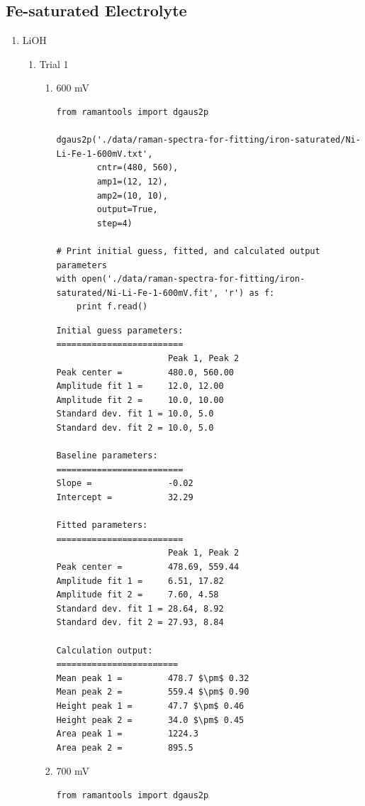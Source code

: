 \documentclass[journal=jpccck,manuscript=suppinfo,email=true]{achemso}
\begin{document}
\subsection{Fe-saturated Electrolyte}
\label{sec-4-2}
\begin{enumerate}
\item LiOH
\label{sec-4-2-0-1}
\begin{enumerate}
\item Trial 1
\label{sec-4-2-0-1-1}
\begin{enumerate}
\item 600 mV
\label{sec-4-2-0-1-1-1}
\begin{verbatim}
from ramantools import dgaus2p

dgaus2p('./data/raman-spectra-for-fitting/iron-saturated/Ni-Li-Fe-1-600mV.txt',
        cntr=(480, 560),
        amp1=(12, 12),
        amp2=(10, 10),
        output=True,
        step=4)

# Print initial guess, fitted, and calculated output parameters
with open('./data/raman-spectra-for-fitting/iron-saturated/Ni-Li-Fe-1-600mV.fit', 'r') as f:
    print f.read()
\end{verbatim}

\begin{verbatim}
Initial guess parameters:
=========================
                      Peak 1, Peak 2
Peak center =         480.0, 560.00
Amplitude fit 1 =     12.0, 12.00
Amplitude fit 2 =     10.0, 10.00
Standard dev. fit 1 = 10.0, 5.0
Standard dev. fit 2 = 10.0, 5.0

Baseline parameters:
=========================
Slope =               -0.02
Intercept =           32.29

Fitted parameters:
=========================
                      Peak 1, Peak 2
Peak center =         478.69, 559.44
Amplitude fit 1 =     6.51, 17.82
Amplitude fit 2 =     7.60, 4.58
Standard dev. fit 1 = 28.64, 8.92
Standard dev. fit 2 = 27.93, 8.84

Calculation output:
========================
Mean peak 1 =         478.7 $\pm$ 0.32
Mean peak 2 =         559.4 $\pm$ 0.90
Height peak 1 =       47.7 $\pm$ 0.46
Height peak 2 =       34.0 $\pm$ 0.45
Area peak 1 =         1224.3
Area peak 2 =         895.5
\end{verbatim}

\item 700 mV
\label{sec-4-2-0-1-1-2}
\begin{verbatim}
from ramantools import dgaus2p


\end{verbatim}
\end{enumerate}
\end{enumerate}
\end{enumerate}
\end{document}

